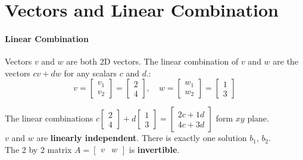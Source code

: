 \section{Vectors and Linear Combination}
\label{sec:vectors_and_linear_combination}

\paragraph{Linear Combination}
Vectors $v$ and $w$ are both 2D vectors. The linear combination of $v$ and $w$ are
the vectors $cv + dw$ for any scalars $c$ and $d$.:
\[
	v =
	\begin{bmatrix}
		v_{1} \\
		v_{2}
	\end{bmatrix}
	=
	\begin{bmatrix}
		2 \\
		4
	\end{bmatrix}, \quad w = \begin{bmatrix}w_{1} \\ w_{2} \end{bmatrix}=
	\begin{bmatrix}
		1 \\
		3
	\end{bmatrix}
\]

\noindent
The linear combinations $c
	\begin{bmatrix}
		2 \\
		4
	\end{bmatrix}
	+ d
	\begin{bmatrix}
		1 \\
		3
	\end{bmatrix}
	=
	\begin{bmatrix}
		2c + 1d \\
		4c + 3d
	\end{bmatrix}$ form $xy$ plane. \\

\noindent
$v$ and $w$ are \textbf{linearly independent}. There is exactly one solution
$b_{1}$, $b_{2}$. \\

\noindent
The 2 by 2 matrix $A =
	\begin{bmatrix}
		v & w
	\end{bmatrix}$ is \textbf{invertible}.

